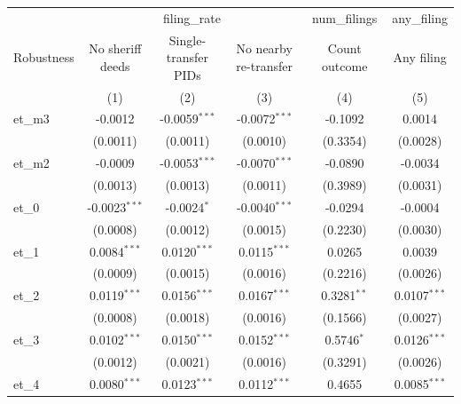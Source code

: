 
\begingroup
\centering
\begin{tabular}{lccccc}
   \toprule
    & \multicolumn{3}{c}{filing\_rate} & num\_filings & any\_filing\\
   Robustness         & No sheriff deeds & Single-transfer PIDs & No nearby re-transfer & Count outcome & Any filing \\   
                      & (1)              & (2)                  & (3)                   & (4)           & (5)\\  
   \midrule 
   et\_m3             & -0.0012          & -0.0059$^{***}$      & -0.0072$^{***}$       & -0.1092       & 0.0014\\   
                      & (0.0011)         & (0.0011)             & (0.0010)              & (0.3354)      & (0.0028)\\   
   et\_m2             & -0.0009          & -0.0053$^{***}$      & -0.0070$^{***}$       & -0.0890       & -0.0034\\   
                      & (0.0013)         & (0.0013)             & (0.0011)              & (0.3989)      & (0.0031)\\   
   et\_0              & -0.0023$^{***}$  & -0.0024$^{*}$        & -0.0040$^{***}$       & -0.0294       & -0.0004\\   
                      & (0.0008)         & (0.0012)             & (0.0015)              & (0.2230)      & (0.0030)\\   
   et\_1              & 0.0084$^{***}$   & 0.0120$^{***}$       & 0.0115$^{***}$        & 0.0265        & 0.0039\\   
                      & (0.0009)         & (0.0015)             & (0.0016)              & (0.2216)      & (0.0026)\\   
   et\_2              & 0.0119$^{***}$   & 0.0156$^{***}$       & 0.0167$^{***}$        & 0.3281$^{**}$ & 0.0107$^{***}$\\   
                      & (0.0008)         & (0.0018)             & (0.0016)              & (0.1566)      & (0.0027)\\   
   et\_3              & 0.0102$^{***}$   & 0.0150$^{***}$       & 0.0152$^{***}$        & 0.5746$^{*}$  & 0.0126$^{***}$\\   
                      & (0.0012)         & (0.0021)             & (0.0016)              & (0.3291)      & (0.0026)\\   
   et\_4              & 0.0080$^{***}$   & 0.0123$^{***}$       & 0.0112$^{***}$        & 0.4655        & 0.0085$^{***}$\\   

\end{tabular}
